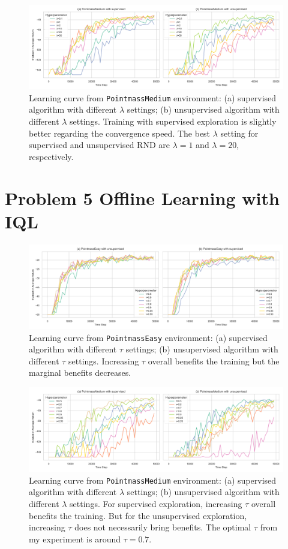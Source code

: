 \documentclass[10pt, letterpaper]{article}
\begin{document}
\begin{figure}[h!]
    \centering
    \includegraphics[width=\textwidth]{q4_medium.png}
    \caption{Learning curve from \texttt{PointmassMedium} environment: (a) supervised algorithm with different $\lambda$ settings; (b) unsupervised algorithm with different $\lambda$ settings. Training with supervised exploration is slightly better regarding the convergence speed. The best $\lambda$ setting for supervised and unsupervised RND are $\lambda=1$ and $\lambda=20$, respectively.}
\end{figure}

\pagebreak
\section*{Problem 5 Offline Learning with IQL}
\begin{figure}[h!]
    \centering
    \includegraphics[width=\textwidth]{q5_easy.png}
    \caption{Learning curve from \texttt{PointmassEasy} environment: (a) supervised algorithm with different $\tau$ settings; (b) unsupervised algorithm with different $\tau$ settings. Increasing $\tau$ overall benefits the training but the marginal benefits decreases.}
\end{figure}

\begin{figure}[h!]
    \centering
    \includegraphics[width=\textwidth]{q5_medium.png}
    \caption{Learning curve from \texttt{PointmassMedium} environment: (a) supervised algorithm with different $\lambda$ settings; (b) unsupervised algorithm with different $\lambda$ settings. For supervised exploration, increasing $\tau$ overall benefits the training. But for the unsupervised exploration, increasing $\tau$ does not necessarily bring benefits. The optimal $\tau$ from my experiment is around $\tau=0.7$.}
\end{figure}
\end{document}

